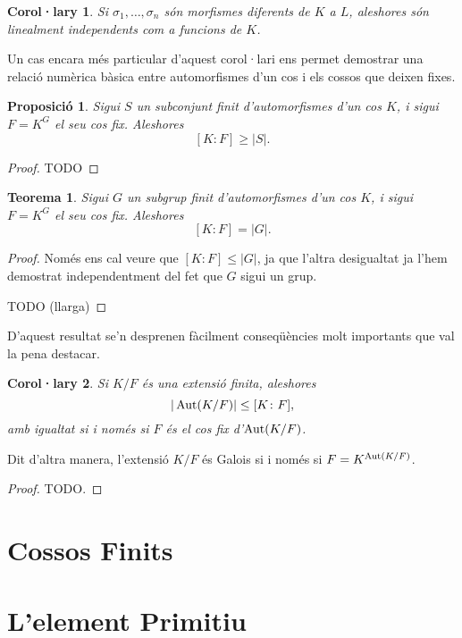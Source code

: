 \documentclass[
]{book}
\newtheorem{theorem}{Teorema}[chapter]
\newtheorem{corollary}{Corol·lary}[chapter]
\newtheorem{proposition}{Proposició}[chapter]
\theoremstyle{definition}
\theoremstyle{definition}
\theoremstyle{definition}
\theoremstyle{definition}
\theoremstyle{remark}
\begin{document}
\begin{corollary}
Si \(\sigma_1,\ldots,\sigma_n\) són morfismes diferents de \(K\) a \(L\), aleshores són linealment independents com a funcions de \(K\).
\end{corollary}

Un cas encara més particular d'aquest corol·lari ens permet demostrar una relació numèrica bàsica entre automorfismes d'un cos
i els cossos que deixen fixes.

\begin{proposition}
Sigui \(S\) un subconjunt finit d'automorfismes d'un cos \(K\), i sigui \(F=K^G\) el seu cos fix. Aleshores
\[
[K\colon F] \geq |S|.
\]
\end{proposition}

\begin{proof}
TODO
\end{proof}

\begin{theorem}
Sigui \(G\) un subgrup finit d'automorfismes d'un cos \(K\), i sigui \(F=K^G\) el seu cos fix. Aleshores
\[
[K\colon F] = |G|.
\]
\end{theorem}

\begin{proof}
Només ens cal veure que \([K\colon F] \leq |G|\), ja que l'altra desigualtat ja l'hem demostrat independentment
del fet que \(G\) sigui un grup.

TODO (llarga)
\end{proof}

D'aquest resultat se'n desprenen fàcilment conseqüències molt importants que val la pena destacar.

\begin{corollary}
Si \(K/F\) és una extensió finita, aleshores
\[
|\operatorname{Aut}(K/F)| \leq [K\colon F],
\]
amb igualtat si i només si \(F\) és el cos fix d'\(\operatorname{Aut}(K/F)\).
\end{corollary}

Dit d'altra manera, l'extensió \(K/F\) és Galois si i només si \(F=K^{\operatorname{Aut}(K/F)}\).

\begin{proof}
TODO.
\end{proof}

\hypertarget{cossos-finits}{%
\chapter{Cossos Finits}\label{cossos-finits}}

\hypertarget{lelement-primitiu}{%
\chapter{L'element Primitiu}\label{lelement-primitiu}}
\end{document}

